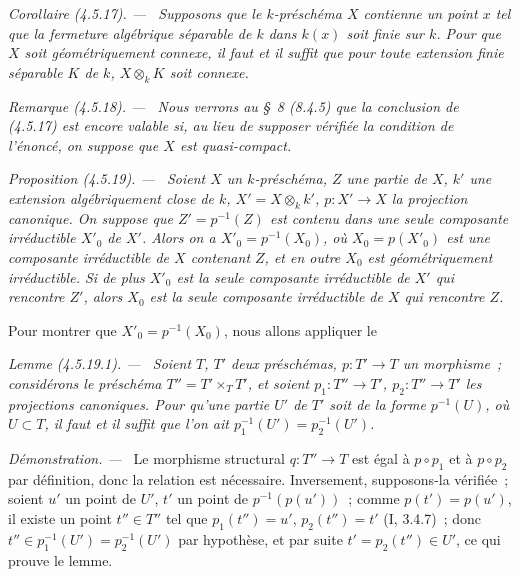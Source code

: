 \documentclass[10pt,oneside]{book}
\makeatletter
\newcommand{\oldpage}[2][]{%
  \setcounter{footnote}{0}%
  \marginpar{\scriptsize\textbf{#1}~|~#2}\ignorespaces}
\newenvironment{proposition}[1][]{%
  \par\medskip\noindent\itshape Proposition (#1). ---\ }{\par}
\newenvironment{corollary}[1][]{%
  \par\medskip\noindent\itshape Corollaire (#1). ---\ }{\par}
\newenvironment{remark}[1][]{%
  \par\medskip\noindent\itshape Remarque (#1). ---\ }{\par}
\newenvironment{lemma}[1][]{%
  \par\medskip\noindent\itshape Lemme (#1). ---\ }{\par}
\newenvironment{proof}{%
  \par\medskip\noindent\textit{Démonstration. ---\ }}{\par}
\newcommand{\EGAReaderTarget}[2]{\hypertarget{#1}{}\@bsphack\begingroup\def\@currentHref{#1}\label{#2}\endgroup\@esphack}
\makeatother
\begin{document}
\oldpage[IV-2]{66}

\begin{corollary}[4.5.17]
\label{IV.2.4.5.17-fr}
Supposons que le $k$-préschéma $X$ contienne un point $x$ tel que la fermeture
algébrique séparable de $k$ dans $k(x)$ soit finie sur $k$. Pour que $X$ soit
géométriquement connexe, il faut et il suffit que pour toute extension finie
séparable $K$ de $k$, $X\otimes_k K$ soit connexe.
\end{corollary}

\begin{remark}[4.5.18]
\label{IV.2.4.5.18-fr}
Nous verrons au \S~8 (8.4.5) que la conclusion de (4.5.17) est encore valable
si, au lieu de supposer vérifiée la condition de l'énoncé, on suppose que $X$
est \emph{quasi-compact}.
\end{remark}

\begin{proposition}[4.5.19]
\EGAReaderTarget{ega4.c04.prop.4-5-19}{IV.2.4.5.19-fr}
Soient $X$ un $k$-préschéma, $Z$ une partie de $X$, $k'$ une extension
algébriquement close de $k$, $X'=X\otimes_k k'$, $p:X'\to X$ la projection
canonique. On suppose que $Z'=p^{-1}(Z)$ est contenu dans une seule composante
irréductible $X'_0$ de $X'$. Alors on a $X'_0=p^{-1}(X_0)$, où
$X_0=p(X'_0)$ est une composante irréductible de $X$ contenant $Z$, et en outre
$X_0$ est géométriquement irréductible. Si de plus $X'_0$ est la seule
composante irréductible de $X'$ qui rencontre $Z'$, alors $X_0$ est la seule
composante irréductible de $X$ qui rencontre $Z$.
\end{proposition}

Pour montrer que $X'_0=p^{-1}(X_0)$, nous allons appliquer le

\begin{lemma}[4.5.19.1]
\label{IV.2.4.5.19.1-fr}
Soient $T$, $T'$ deux préschémas, $p:T'\to T$ un morphisme~; considérons le
préschéma $T''=T'\times_T T'$, et soient $p_1:T''\to T'$, $p_2:T''\to T'$ les
projections canoniques. Pour qu'une partie $U'$ de $T'$ soit de la forme
$p^{-1}(U)$, où $U\subset T$, il faut et il suffit que l'on ait
$p_1^{-1}(U')=p_2^{-1}(U')$.
\end{lemma}

\begin{proof}
Le morphisme structural $q:T''\to T$ est égal à $p\circ p_1$ et à
$p\circ p_2$ par définition, donc la relation est nécessaire. Inversement,
supposons-la vérifiée~; soient $u'$ un point de $U'$, $t'$ un point de
$p^{-1}(p(u'))$~; comme $p(t')=p(u')$, il existe un point $t''\in T''$ tel que
$p_1(t'')=u'$, $p_2(t'')=t'$ (I, 3.4.7)~; donc
$t''\in p_1^{-1}(U')=p_2^{-1}(U')$ par hypothèse, et par suite
$t'=p_2(t'')\in U'$, ce qui prouve le lemme.
\end{proof}
\end{document}
